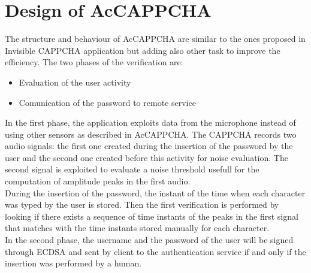 \chapter{Design of AcCAPPCHA}
The structure and behaviour of AcCAPPCHA are similar to the ones proposed in Invisible CAPPCHA application but adding also other task to improve the efficiency. The two phases of the verification are:
\begin{itemize}
\item{Evaluation of the user activity}
\item{Comunication of the password to remote service}
\end{itemize}
In the first phase, the application exploits data from the microphone instead of using other sensors as described in AcCAPPCHA. The CAPPCHA records two audio signals: the first one created during the insertion of the password by the user and the second one created before this activity for noise evaluation. The second signal is exploited to evaluate a noise threshold usefull for the computation of amplitude peaks in the first audio.\\
During the insertion of the password, the instant of the time when each character was typed by the user is stored. Then the first verification is performed by looking if there exists a sequence of time instants of the peaks in the first signal that matches with the time instants stored manually for each character.\\
In the second phase, the username and the password of the user will be signed through ECDSA and sent by client to the authentication service if and only if the insertion was performed by a human.

